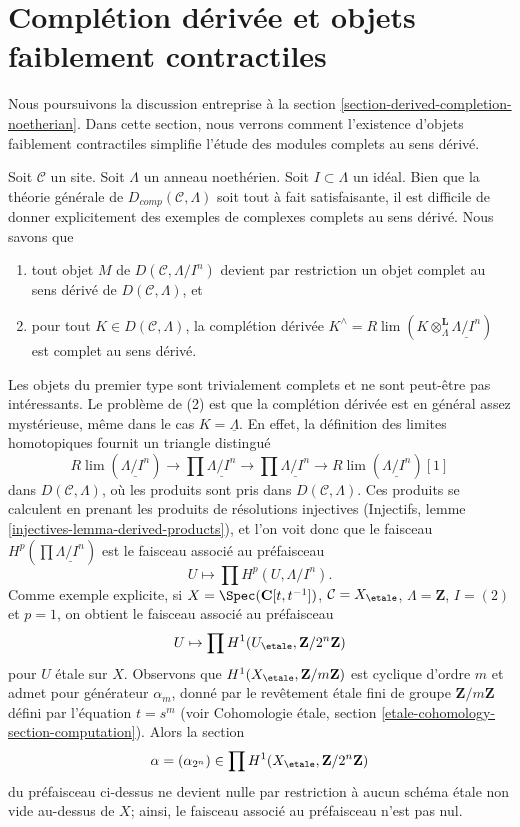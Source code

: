 \section{Complétion dérivée et objets faiblement contractiles}
\label{section-derived-completion-proetale}

\noindent
Nous poursuivons la discussion entreprise à la
section \ref{section-derived-completion-noetherian}.
Dans cette section, nous verrons comment l'existence
d'objets faiblement contractiles simplifie l'étude
des modules complets au sens dérivé.

\medskip\noindent
Soit $\mathcal{C}$ un site. Soit $\Lambda$ un anneau noethérien.
Soit $I \subset \Lambda$ un idéal. Bien que la théorie générale
de $D_{comp}(\mathcal{C}, \Lambda)$ soit tout à fait satisfaisante,
il est difficile de donner explicitement des exemples de complexes complets au sens dérivé.
Nous savons que
\begin{enumerate}
\item tout objet $M$ de $D(\mathcal{C}, \Lambda/I^n)$ devient par restriction un objet
complet au sens dérivé de $D(\mathcal{C}, \Lambda)$, et
\item pour tout $K \in D(\mathcal{C}, \Lambda)$, la complétion dérivée
$K^\wedge = R\lim (K \otimes_\Lambda^\mathbf{L} \underline{\Lambda/I^n})$
est complet au sens dérivé.
\end{enumerate}
Les objets du premier type sont trivialement complets et ne sont peut-être pas
intéressants. Le problème de (2) est que la complétion dérivée
est en général assez mystérieuse, même dans le cas $K = \underline{\Lambda}$.
En effet, la définition des limites homotopiques fournit
un triangle distingué
$$
R\lim(\underline{\Lambda/I^n}) \to
\prod \underline{\Lambda/I^n} \to
\prod \underline{\Lambda/I^n} \to
R\lim(\underline{\Lambda/I^n})[1]
$$
dans $D(\mathcal{C}, \Lambda)$, où les produits sont pris dans
$D(\mathcal{C}, \Lambda)$. Ces produits se calculent en prenant les produits
de résolutions injectives
(Injectifs, lemme \ref{injectives-lemma-derived-products}),
et l'on voit donc que le faisceau $H^p(\prod \underline{\Lambda/I^n})$
est le faisceau associé au préfaisceau
$$
U \longmapsto \prod H^p(U, \Lambda/I^n).
$$
Comme exemple explicite, si $X = \Spec(\mathbf{C}[t, t^{-1}])$,
$\mathcal{C} = X_\etale$, $\Lambda = \mathbf{Z}$, $I = (2)$ et
$p = 1$, on obtient le faisceau associé au préfaisceau
$$
U \mapsto \prod H^1(U_\etale, \mathbf{Z}/2^n\mathbf{Z})
$$
pour $U$ \'etale sur $X$. Observons que $H^1(X_\etale, \mathbf{Z}/m\mathbf{Z})$
est cyclique d'ordre $m$ et admet pour générateur $\alpha_m$, donné par le revêtement \'etale fini
de groupe $\mathbf{Z}/m\mathbf{Z}$ défini par l'équation $t = s^m$
(voir Cohomologie \'etale, section \ref{etale-cohomology-section-computation}).
Alors la section
$$
\alpha = (\alpha_{2^n}) \in \prod H^1(X_\etale, \mathbf{Z}/2^n\mathbf{Z})
$$
du préfaisceau ci-dessus ne devient nulle par restriction à aucun schéma \'etale
non vide au-dessus de $X$; ainsi, le faisceau associé au préfaisceau n'est pas nul.

